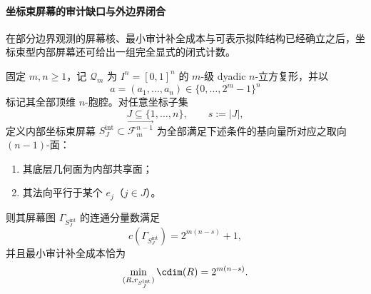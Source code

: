 \paragraph{坐标束屏幕的审计缺口与外边界闭合}
在部分边界观测的屏幕核、最小审计补全成本与可表示拟阵结构已经确立之后，坐标束型内部屏幕还可给出一组完全显式的闭式计数。

\begin{theorem}[内部坐标束屏幕的连通分量与审计补全成本闭式]\label{thm:spg-internal-coordinate-bundle-screen-cost-closed-form}
固定 \(m,n\ge 1\)，记 \(\mathcal Q_m\) 为 \(I^n=[0,1]^n\) 的 \(m\)-级 dyadic \(n\)-立方复形，并以
\[
a=(a_1,\dots,a_n)\in\{0,\dots,2^m-1\}^n
\]
标记其全部顶维 \(n\)-胞腔。对任意坐标子集
\[
J\subseteq \{1,\dots,n\},
\qquad
s:=|J|,
\]
定义内部坐标束屏幕 \(S_J^{\mathrm{int}}\subset \overrightarrow{\mathcal F_m^{n-1}}\) 为全部满足下述条件的基向量所对应之取向 \((n-1)\)-面：
\begin{enumerate}
  \item 其底层几何面为内部共享面；
  \item 其法向平行于某个 \(e_j\)（\(j\in J\)）。
\end{enumerate}
则其屏幕图 \(\Gamma_{S_J^{\mathrm{int}}}\) 的连通分量数满足
\[
c(\Gamma_{S_J^{\mathrm{int}}})=2^{m(n-s)}+1,
\]
并且最小审计补全成本恰为
\[
\min_{(R,r_{S_J^{\mathrm{int}}})}\cdim(R)=2^{m(n-s)}.
\]
\end{theorem}
